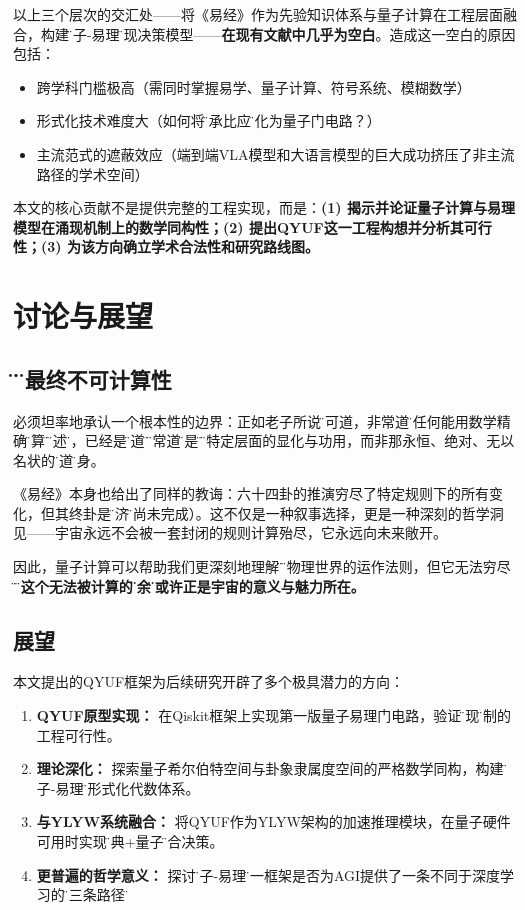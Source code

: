 \documentclass[twocolumn]{article}
\begin{document}
以上三个层次的交汇处——将《易经》作为先验知识体系与量子计算在工程层面融合，构建\"量子-易理\"涌现决策模型——\textbf{在现有文献中几乎为空白}。造成这一空白的原因包括：
\begin{itemize}
  \item 跨学科门槛极高（需同时掌握易学、量子计算、符号系统、模糊数学）
  \item 形式化技术难度大（如何将\"乘承比应\"转化为量子门电路？）
  \item 主流范式的遮蔽效应（端到端VLA模型和大语言模型的巨大成功挤压了非主流路径的学术空间）
\end{itemize}

本文的核心贡献不是提供完整的工程实现，而是：\textbf{(1) 揭示并论证量子计算与易理模型在涌现机制上的数学同构性；(2) 提出QYUF这一工程构想并分析其可行性；(3) 为该方向确立学术合法性和研究路线图。}

\section{讨论与展望}

\subsection{\"道\"的最终不可计算性}

必须坦率地承认一个根本性的边界：正如老子所说\"道可道，非常道\"，任何能用数学精确\"计算\"和\"描述\"的，已经是\"可道\"的\"非常道\"，是\"道\"在特定层面的显化与功用，而非那永恒、绝对、无以名状的\"常道\"本身。

《易经》本身也给出了同样的教诲：六十四卦的推演穷尽了特定规则下的所有变化，但其终卦是\"未济\"（尚未完成）。这不仅是一种叙事选择，更是一种深刻的哲学洞见——宇宙永远不会被一套封闭的规则计算殆尽，它永远向未来敞开。

因此，量子计算可以帮助我们更深刻地理解\"道\"在物理世界的运作法则，但它无法穷尽\"道\"。\textbf{这个无法被计算的\"剩余\"，或许正是宇宙的意义与魅力所在。}

\subsection{展望}

本文提出的QYUF框架为后续研究开辟了多个极具潜力的方向：

\begin{enumerate}
  \item \textbf{QYUF原型实现：} 在Qiskit框架上实现第一版量子易理门电路，验证\"涌现\"机制的工程可行性。
  \item \textbf{理论深化：} 探索量子希尔伯特空间与卦象隶属度空间的严格数学同构，构建\"量子-易理\"的形式化代数体系。
  \item \textbf{与YLYW系统融合：} 将QYUF作为YLYW架构的加速推理模块，在量子硬件可用时实现\"经典+量子\"混合决策。
  \item \textbf{更普遍的哲学意义：} 探讨\"量子-易理\"统一框架是否为AGI提供了一条不同于深度学习的\"第三条路径\"。
\end{enumerate}
\end{document}
